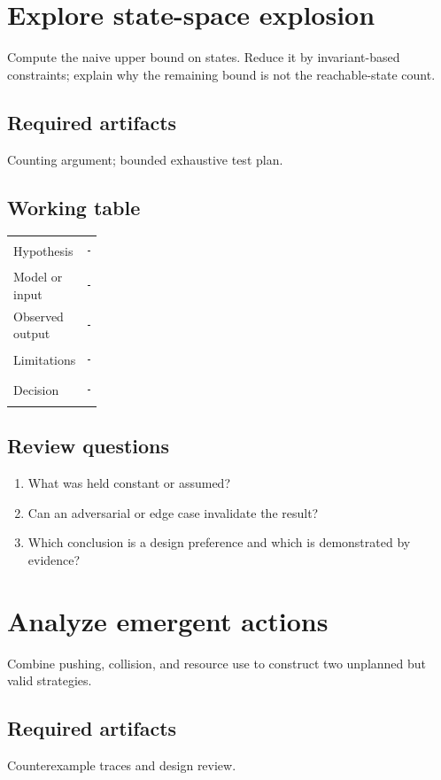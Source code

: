 \documentclass[11pt]{article}
\begin{document}
\section{Explore state-space explosion}
Compute the naive upper bound on states. Reduce it by invariant-based constraints; explain why the remaining bound is not the reachable-state count.


\subsection{Required artifacts}
Counting argument; bounded exhaustive test plan.


\subsection{Working table}
\begin{tabularx}{\linewidth}{@{}p{0.20\linewidth}X@{}}\toprule
Hypothesis & \rule{0.90\linewidth}{0.4pt}\\[0.35cm]
Model or input & \rule{0.90\linewidth}{0.4pt}\\[0.35cm]
Observed output & \rule{0.90\linewidth}{0.4pt}\\[0.35cm]
Limitations & \rule{0.90\linewidth}{0.4pt}\\[0.35cm]
Decision & \rule{0.90\linewidth}{0.4pt}\\\bottomrule\end{tabularx}

\subsection{Review questions}
\begin{enumerate}
\item What was held constant or assumed?
\item Can an adversarial or edge case invalidate the result?
\item Which conclusion is a design preference and which is demonstrated by evidence?
\end{enumerate}

\section{Analyze emergent actions}
Combine pushing, collision, and resource use to construct two unplanned but valid strategies.


\subsection{Required artifacts}
Counterexample traces and design review.
\end{document}
